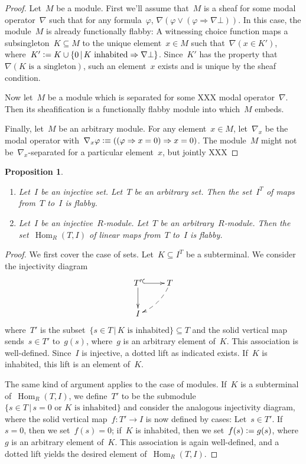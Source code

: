 \documentclass[oneside]{amsart}
\theoremstyle{definition}
\theoremstyle{plain}
\newtheorem{prop}[defn]{Proposition}
\theoremstyle{remark}
\newcommand{\defeq}{\vcentcolon=}
\newcommand{\defeqv}{\vcentcolon\equiv}
\DeclareMathOperator{\Hom}{Hom}
\renewcommand{\_}{\mathpunct{.}\,}
\begin{document}
\begin{proof}Let~$M$ be a module. First we'll assume that~$M$
is a sheaf for some modal operator~$\nabla$ such that for any
formula~$\varphi$, $\nabla(\varphi \vee (\varphi \Rightarrow \nabla\bot))$. In
this case, the module~$M$ is already functionally flabby: A witnessing choice
function maps a subsingleton~$K \subseteq M$ to the unique element~$x \in M$
such that~$\nabla(x \in K')$, where~$K' \defeq K \cup \{ 0 \,|\, \text{$K$
inhabited} \Rightarrow \nabla\bot \}$. Since~$K'$ has the property
that~$\nabla(\text{$K$ is a singleton})$, such an element~$x$ exists and is unique
by the sheaf condition.

Now let~$M$ be a module which is separated for some XXX modal operator~$\nabla$.
Then its sheafification is a functionally flabby module into which~$M$ embeds.

Finally, let~$M$ be an arbitrary module. For any element~$x \in M$,
let~$\nabla_x$ be the modal operator with~$\nabla_x\varphi \defeqv ((\varphi \Rightarrow x
= 0) \Rightarrow x = 0)$. The module~$M$ might not be~$\nabla_x$-separated for
a particular element~$x$, but jointly XXX
\end{proof}

\begin{prop}\label{prop:hom-flabby}
\begin{enumerate}
\item Let~$I$ be an injective set. Let~$T$ be an arbitrary set. Then the
set~$I^T$ of maps from~$T$ to~$I$ is flabby.
\item Let~$I$ be an injective~$R$-module. Let~$T$ be an arbitrary~$R$-module. Then the
set~$\Hom_R(T,I)$ of linear maps from~$T$ to~$I$ is flabby.
\end{enumerate}\end{prop}

\begin{proof}We first cover the case of sets. Let~$K \subseteq I^T$ be a
subterminal. We consider the injectivity diagram
\[ \xymatrix{
  T' \ar@{^{(}->}[r]\ar[d] & T \ar@{-->}@/^/[ld] \\
  I
} \]
where~$T'$ is the subset~$\{ s \in T \,|\, \text{$K$ is inhabited} \} \subseteq T$ and the
solid vertical map sends~$s \in T'$ to~$g(s)$, where~$g$ is an arbitrary element
of~$K$. This association is well-defined. Since~$I$ is injective, a dotted lift
as indicated exists. If~$K$ is inhabited, this lift is an element of~$K$.

The same kind of argument applies to the case of modules. If~$K$ is a
subterminal of~$\Hom_R(T,I)$, we define~$T'$ to be the submodule
$\{ s \in T \,|\, \text{$s = 0$ or $K$ is inhabited} \}$ and consider the
analogous injectivity diagram, where the solid vertical map~$f : T' \to I$ is now
defined by cases: Let~$s \in T'$. If~$s = 0$, then we set~$f(s) = 0$; if~$K$ is
inhabited, then we set~$f(s) \defeq g(s)$, where~$g$ is an arbitrary element
of~$K$. This association is again well-defined, and a dotted lift yields the
desired element of~$\Hom_R(T,I)$.
\end{proof}
\end{document}

